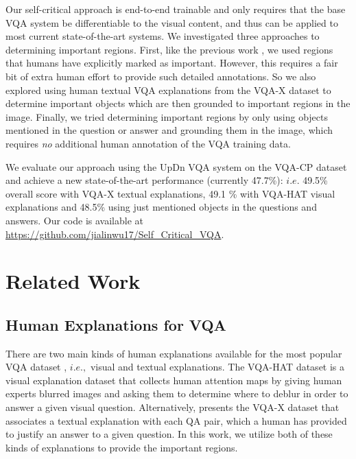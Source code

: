 \documentclass{article}
\begin{document}
Our self-critical approach is end-to-end trainable and only requires that the base VQA system be differentiable to the visual content, and thus can be applied to most current state-of-the-art systems. We investigated three approaches to determining important regions. First,
like the previous work \cite{trott2017interpretable,zhang2019interpretable,selvaraju2019taking,qiao2018exploring}, we used regions that humans have explicitly marked as important. However, this requires a fair bit of extra human effort to provide such detailed annotations.
So we also explored using human textual VQA explanations from the  VQA-X \cite{park2018multimodal} dataset to determine important objects which are then grounded to important regions in the image. Finally, we tried determining important regions by only using objects mentioned in the question or answer and grounding them in the image, which requires {\it no} additional human annotation of the VQA training data.

We evaluate our approach using the UpDn VQA system \cite{anderson2017bottom} on the VQA-CP dataset \cite{vqa-cp} and achieve a new state-of-the-art performance (currently 47.7\%): $i.e.$ 49.5\% overall score with VQA-X \cite{park2018multimodal} textual explanations, 49.1 \% with VQA-HAT \cite{das2017human} visual explanations and 48.5\% using just mentioned objects in the questions and answers.  Our code is available at \url{https://github.com/jialinwu17/Self_Critical_VQA}.

\section{Related Work}
\subsection{Human Explanations for VQA}
There are two main kinds of human explanations available for the most popular VQA dataset \cite{antol2015vqa}, $i.e., $ visual and textual explanations. The VQA-HAT dataset \cite{das2017human} is a visual explanation dataset that collects human attention maps by giving human experts blurred images and asking them to determine where to deblur in order to answer a given visual question. Alternatively, \cite{park2018multimodal} presents the VQA-X dataset that associates a textual explanation with each QA pair, which a human has provided to justify an answer to a given question. In this work, we utilize both of these kinds of explanations to provide the important regions. 
\end{document}
